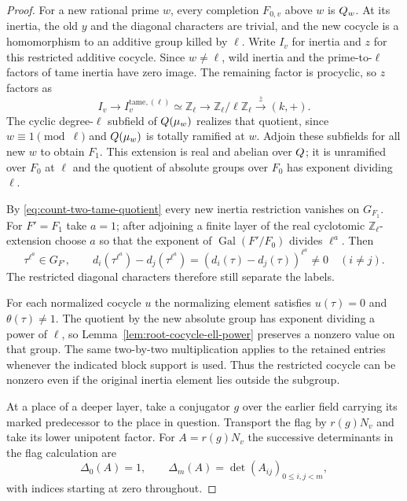 \begin{proof}
For a new rational prime \(w\), every completion \(F_{0,v}\)
above \(w\) is \(Q_w\). At its inertia, the old \(y\) and the
diagonal characters are trivial, and the new cocycle is a
homomorphism to an additive group killed by \(\ell\).
Write \(I_v\) for inertia and \(z\) for this restricted
additive cocycle. Since \(w\ne\ell\), wild inertia and the
prime-to-\(\ell\) factors of tame inertia have zero image. The
remaining factor is procyclic, so \(z\) factors as
\begin{equation}\label{eq:count-two-tame-quotient}
 I_v\longrightarrow I_v^{\mathrm{tame},(\ell)}\simeq\mathbb Z_\ell
  \longrightarrow\mathbb Z_\ell/\ell\mathbb Z_\ell
  \xrightarrow{\ \bar z\ }(k,+).
\end{equation} The cyclic
degree-\(\ell\) subfield of \(Q(\mu_w)\) realizes that
quotient, since \(w\equiv1\pmod\ell\) and \(Q(\mu_w)\) is
totally ramified at \(w\). Adjoin these subfields for all
new \(w\) to obtain \(F_1\). This extension is real and abelian
over \(Q\); it is unramified over \(F_0\) at \(\ell\) and the
quotient of absolute groups over \(F_0\) has exponent dividing
\(\ell\).

By \eqref{eq:count-two-tame-quotient} every new inertia
restriction vanishes on \(G_{F_1}\). For \(F'=F_1\) take \(a=1\);
after adjoining a finite layer of the real cyclotomic
\(\mathbb Z_\ell\)-extension choose \(a\) so that the exponent
of \(\operatorname{Gal}(F'/F_0)\) divides \(\ell^a\). Then
\[
 \tau^{\ell^a}\in G_{F'},\qquad
 d_i(\tau^{\ell^a})-d_j(\tau^{\ell^a})
       =(d_i(\tau)-d_j(\tau))^{\ell^a}\ne0\quad(i\ne j).
\]
The restricted diagonal characters therefore still separate the labels.

For each normalized cocycle \(u\) the normalizing element satisfies
\(u(\tau)=0\) and \(\theta(\tau)\ne1\). The quotient by the new absolute
group has exponent dividing a power of \(\ell\), so
Lemma~\ref{lem:root-cocycle-ell-power} preserves a nonzero value on
that group.
The same two-by-two multiplication applies to the retained
entries whenever the indicated block support is used.
Thus the restricted cocycle can be nonzero even if the original inertia element lies outside the subgroup.

At a place of a deeper layer, take a conjugator \(g\) over
the earlier field carrying its marked predecessor to the
place in question. Transport the flag by \(r(g)N_v\) and
take its lower unipotent factor. For \(A=r(g)N_v\) the successive determinants in the flag calculation are
\[
 \Delta_0(A)=1,\qquad \Delta_m(A)=\det(A_{ij})_{0\le i,j<m},
\]
with indices starting at zero throughout.


\end{proof}
